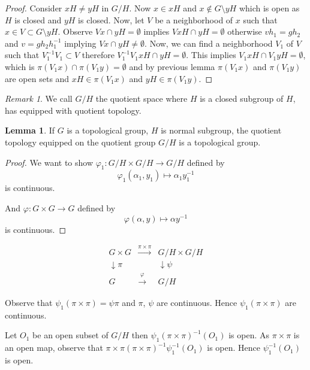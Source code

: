 \documentclass[11pt]{article}
\theoremstyle{definition}
\newtheorem{lemma}{Lemma}[section]
\theoremstyle{remark}
\newtheorem{remark}{Remark}[section]
\begin{document}
\begin{proof}
Consider $xH \neq yH$ in $G/H$.
Now $x \in xH$ and $x \notin G \setminus yH$ which is open as $H$ is closed and $yH$ is closed.
Now, let $V$ be a neighborhood of $x$ such that $x \in V \subset G \setminus yH$.
Observe $Vx \cap yH = \emptyset$ implies $VxH \cap yH = \emptyset$ otherwise $vh_1 = gh_2$ and $v = gh_2h_1^{-1}$ implying $Vx \cap yH \neq \emptyset$.
Now, we can find a neighborhood $V_1$ of $V$ such that $V_1^{-1}V_1 \subset V$ therefore $V_1^{-1}V_1xH \cap yH = \emptyset$.
This implies $V_1xH \cap V_1yH = \emptyset$, which is
$\pi(V_1x) \cap \pi(V_1y) = \emptyset$ and by previous lemma $\pi(V_1x)$ and $\pi(V_1y)$ are open sets and $xH \in \pi(V_1x)$ and $yH \in \pi(V_1y)$.
\end{proof}

\begin{remark}
We call $G/H$ the quotient space where $H$ is a closed subgroup of $H$, has equipped with quotient topology.
\end{remark}

\begin{lemma}\label{lem:quotient_topology_group}
If $G$ is a topological group, $H$ is normal subgroup, the quotient topology equipped on the quotient group $G/H$ is a topological group.
\end{lemma}

\begin{proof}
We want to show $\varphi_1: G/H \times G/H \to G/H$ defined by
\[
\varphi_1(\alpha_1, y_1) \mapsto \alpha_1 y_1^{-1}
\]
is continuous.

And $\varphi: G \times G \to G$ defined by
\[
\varphi(\alpha, y) \mapsto \alpha y^{-1}
\]
is continuous.
\end{proof}

\[
\begin{array}{ccc}
G \times G & \xrightarrow{\pi \times \pi} & G/H \times G/H \\
\downarrow{\pi} & & \downarrow{\psi} \\
G & \xrightarrow{\varphi} & G/H
\end{array}
\]

Observe that $\psi_1(\pi \times \pi) = \psi \pi$ and $\pi$, $\psi$ are continuous. Hence $\psi_1(\pi \times \pi)$ are continuous.

Let $O_1$ be an open subset of $G/H$ then
$\psi_1(\pi \times \pi)^{-1}(O_1)$ is open. As $\pi \times \pi$ is an open map, observe that $\pi \times \pi (\pi \times \pi)^{-1} \psi_1^{-1}(O_1)$ is open. Hence $\psi_1^{-1}(O_1)$ is open.
\end{document}
